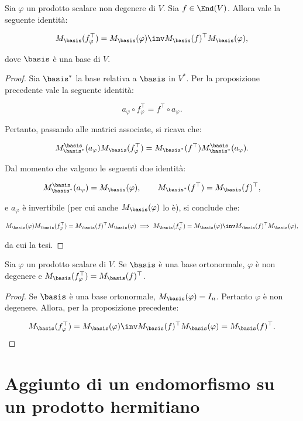 \begin{proposition}
	Sia $\varphi$ un prodotto scalare non degenere di $V$. Sia $f \in \End(V)$. Allora
	vale la seguente identità:
	
	\[ M_\basis(f_\varphi^\top) = M_\basis(\varphi)\inv M_\basis(f)^\top M_\basis(\varphi), \]
	
	dove $\basis$ è una base di $V$.
\end{proposition}

\begin{proof}
	Sia $\basis^*$ la base relativa a $\basis$ in $V^*$. Per la proposizione precedente vale la seguente identità:
	
	\[ a_\varphi \circ f_\varphi^\top = f^\top \circ a_\varphi. \]
	
	Pertanto, passando alle matrici associate, si ricava che:
	
	\[ M_{\basis^*}^\basis(a_\varphi) M_\basis(f_\varphi^\top) = M_{\basis^*}(f^\top) M_{\basis^*}^\basis(a_\varphi). \]
	
	Dal momento che valgono le seguenti due identità:
	
	\[ M_{\basis^*}^\basis(a_\varphi) = M_\basis(\varphi), \qquad M_{\basis^*}(f^\top) = M_\basis(f)^\top, \]
	
	e $a_\varphi$ è invertibile (per cui anche $M_\basis(\varphi)$ lo è), si conclude che:
	
	\[ M_\basis(\varphi) M_\basis(f_\varphi^\top) = M_\basis(f)^\top M_\basis(\varphi) \implies M_\basis(f_\varphi^\top) = M_\basis(\varphi)\inv M_\basis(f)^\top M_\basis(\varphi), \]
	
	da cui la tesi.
\end{proof}

\begin{corollary} Sia $\varphi$ un prodotto scalare di $V$.
	Se $\basis$ è una base ortonormale, $\varphi$ è non degenere e $M_\basis(f_\varphi^\top) = M_\basis(f)^\top$.
\end{corollary}

\begin{proof}
	Se $\basis$ è una base ortonormale, $M_\basis(\varphi) = I_n$. Pertanto $\varphi$ è
	non degenere. Allora, per la proposizione precedente:
	
	\[ M_\basis(f_\varphi^\top) = M_\basis(\varphi)\inv M_\basis(f)^\top M_\basis(\varphi) = M_\basis(f)^\top. \]
\end{proof}

\section{Aggiunto di un endomorfismo su un prodotto hermitiano}

